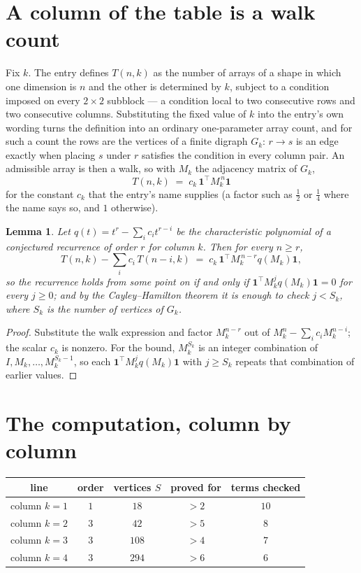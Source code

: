 \documentclass[11pt,a4paper]{article}
\theoremstyle{plain}
\newtheorem{lemma}[theorem]{Lemma}
\theoremstyle{definition}
\begin{document}
\section{A column of the table is a walk count}

Fix $k$. The entry defines $T(n,k)$ as the number of arrays of a shape in which one dimension
is $n$ and the other is determined by $k$, subject to a condition imposed on every
$2\times2$ subblock --- a condition local to two consecutive rows and two consecutive columns.
Substituting the fixed value of $k$ into the entry's own wording turns the definition into an
ordinary one-parameter array count, and for such a count the rows are the vertices of a finite
digraph $G_k$: $r\to s$ is an edge exactly when placing $s$ under $r$ satisfies the condition
in every column pair. An admissible array is then a walk, so with $M_k$ the adjacency matrix
of $G_k$,
\[
T(n,k)\;=\;c_k\,\mathbf{1}^{\!\top}M_k^{\,n}\mathbf{1}
\]
for the constant $c_k$ that the entry's name supplies (a factor such as $\tfrac12$ or
$\tfrac14$ where the name says so, and $1$ otherwise).

\begin{lemma}\label{lem:crit}
Let $q(t)=t^{r}-\sum_i c_it^{r-i}$ be the characteristic polynomial of a conjectured
recurrence of order $r$ for column $k$. Then for every $n\ge r$,
\[
T(n,k)-\sum_i c_i\,T(n-i,k)\;=\;c_k\,\mathbf{1}^{\!\top}M_k^{\,n-r}q(M_k)\mathbf{1},
\]
so the recurrence holds from some point on if and only if
$\mathbf{1}^{\!\top}M_k^{j}q(M_k)\mathbf{1}=0$ for every $j\ge0$; and by the
Cayley--Hamilton theorem it is enough to check $j<S_k$, where $S_k$ is the number of vertices
of $G_k$.
\end{lemma}

\begin{proof}
Substitute the walk expression and factor $M_k^{n-r}$ out of $M_k^{n}-\sum_ic_iM_k^{n-i}$;
the scalar $c_k$ is nonzero. For the bound, $M_k^{S_k}$ is an integer combination of
$I,M_k,\dots,M_k^{S_k-1}$, so each $\mathbf{1}^{\!\top}M_k^{j}q(M_k)\mathbf{1}$ with
$j\ge S_k$ repeats that combination of earlier values.
\end{proof}

\section{The computation, column by column}

\begin{center}
\begin{tabular}{ccccc}
line & order & vertices $S$ & proved for & terms checked \\ \hline
column $k$$=1$ & $1$ & $18$ & $>2$ & $10$ \\
column $k$$=2$ & $3$ & $42$ & $>5$ & $8$ \\
column $k$$=3$ & $3$ & $108$ & $>4$ & $7$ \\
column $k$$=4$ & $3$ & $294$ & $>6$ & $6$ \\
\end{tabular}
\end{center}
\end{document}
